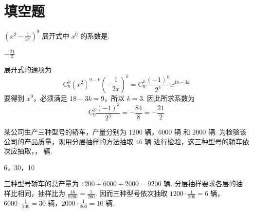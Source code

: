 \section{填空题}
\begin{problem}
\( (x^{2}-\frac{1}{2x})^{9} \) 展开式中 \( x^{9} \) 的系数是\fillinblank{}.
\begin{answer}
\(-\frac{21}{2}\)
\end{answer}

\begin{solution}
展开式的通项为
\[
\mathrm C_{9}^{k}(x^{2})^{9-k}\left(-\frac{1}{2x}\right)^{k}=\mathrm C_{9}^{k}\frac{(-1)^{k}}{2^{k}}x^{18-3k}
\]
要得到 \(x^{9}\)，必须满足 \(18-3k=9\)，所以 \(k=3\). 因此所求系数为
\[
\mathrm C_{9}^{3}\frac{(-1)^{3}}{2^{3}}=-\frac{84}{8}=-\frac{21}{2}
\]
\end{solution}
\end{problem}

\begin{problem}
某公司生产三种型号的轿车，产量分别为 \(1200\text{ 辆}\)，\(6000\text{ 辆}\) 和 \(2000\text{ 辆}\). 为检验该公司的产品质量，现用分层抽样的方法抽取 \(46\text{ 辆}\) 进行检验，这三种型号的轿车依次应抽取\fillinblank{}，\fillinblank{}，\fillinblank{}\(\text{ 辆}\).
\begin{answer}
6，30，10
\end{answer}

\begin{solution}
三种型号轿车的总产量为 \(1200+6000+2000=9200\text{ 辆}\). 分层抽样要求各层的抽样比相同，抽样比为 \(\frac{46}{9200}=\frac{1}{200}\). 因而三种型号依次抽取 \(1200\cdot\frac{1}{200}=6\text{ 辆}\)，\(6000\cdot\frac{1}{200}=30\text{ 辆}\)，\(2000\cdot\frac{1}{200}=10\text{ 辆}\).
\end{solution}
\end{problem}


